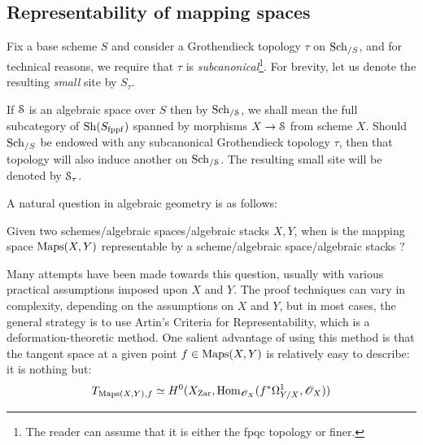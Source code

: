         \subsection{Representability of mapping spaces}
            \begin{convention}
                Fix a base scheme $S$ and consider a Grothendieck topology $\tau$ on $\mathrm{Sch}_{/S}$, and for technical reasons, we require that $\tau$ is \textit{subcanonical}\footnote{The reader can assume that it is either the fpqc topology or finer.}. For brevity, let us denote the resulting \textit{small} site by $S_{\tau}$.

                If $\mathcal{S}$ is an algebraic space over $S$ then by $\mathrm{Sch}_{/\mathcal{S}}$, we shall mean the full subcategory of $\mathrm{Sh}( S_{\mathrm{fppf}} )$ spanned by morphisms $X \to \mathcal{S}$ from scheme $X$. Should $\mathrm{Sch}_{/S}$ be endowed with any subcanonical Grothendieck topology $\tau$, then that topology will also induce another on $\mathrm{Sch}_{/\mathcal{S}}$. The resulting small site will be denoted by $\mathcal{S}_{\tau}$.
            \end{convention}
        
            A natural question in algebraic geometry is as follows:
            \begin{question}
                Given two schemes/algebraic spaces/algebraic stacks $X, Y$, when is the mapping space $\mathrm{Maps}(X, Y)$ representable by a scheme/algebraic space/algebraic stacks ?
            \end{question}

            Many attempts have been made towards this question, usually with various practical assumptions imposed upon $X$ and $Y$. The proof techniques can vary in complexity, depending on the assumptions on $X$ and $Y$, but in most cases, the general strategy is to use Artin's Criteria for Representability, which is a deformation-theoretic method. One salient advantage of using this method is that the tangent space at a given point $f \in \mathrm{Maps}(X, Y)$ is relatively easy to describe: it is nothing but:
                $$T_{\mathrm{Maps}(X, Y), f} \simeq H^0(X_{\mathrm{Zar}}, \mathrm{Hom}_{\mathscr{O}_X}( f^*\Omega^1_{Y/X}, \mathscr{O}_X ))$$
            
